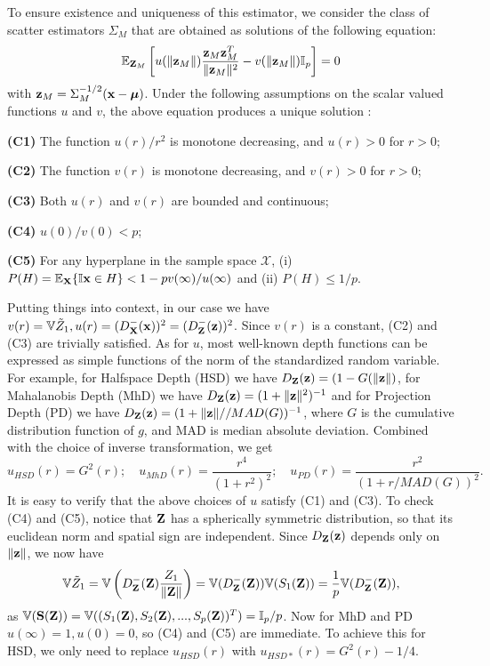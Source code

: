 To ensure existence and uniqueness of this estimator, we consider the class of scatter estimators $\Sigma_M$ that are obtained as solutions of the following equation:
%
\begin{equation}
{\mathbb{E}}_{{\mathbf{Z}}_M} \left[ u( \| {\bf{z}}_M \| )  \frac{{\bf{z}}_M {\bf{z}}_M^T}{\| {\bf{z}}_M \|^2}  - v( \| {\bf{z}}_M \| ) {\mathbb{I}}_p \right] = 0
\end{equation}
%
with ${\bf{z}}_M = \Sigma_M^{-1/2} ({\bf{x}} - {\boldsymbol{\mu}})$. Under the following assumptions on the scalar valued functions $u$ and $v$, the above equation produces a unique solution \citep{HuberBook81}:
%

\vspace{1em}
\noindent\textbf{(C1)} The function $u(r)/r^2$ is monotone decreasing, and $u(r)>0$ for $r>0$;

\noindent\textbf{(C2)}  The function $v(r)$ is monotone decreasing, and $v(r)>0$ for $r>0$;

\noindent\textbf{(C3)} Both $u(r)$ and $v(r)$ are bounded and continuous;

\noindent\textbf{(C4)} $u(0) / v(0) < p$;

\noindent\textbf{(C5)} For any hyperplane in the sample space $\mathcal X$, (i) $P(H) = {\mathbb{E}}_{\mathbf{X}} \{ {\mathbb{I}}{{\bf{x}} \in H} \} < 1 - p v(\infty) / u(\infty)$ and (ii) $P(H) \leq 1/p$.
%

\vspace{1em}
\noindent Putting things into context, in our case we have $v(r) = {\mathbb{V}}\tilde Z_1, u(r) = (D^-_{\mathbf{X}}({\bf{x}}))^2 = (D^-_{\mathbf{Z}}({\bf{z}}))^2$. Since $v(r)$ is a constant, (C2) and (C3) are trivially satisfied. As for $u$, most well-known depth functions can be expressed as simple functions of the norm of the standardized random variable. For example, for Halfspace Depth (HSD) we have $D_{\mathbf{Z}} ({\bf{z}}) = (1 - G(\| {\bf{z}} \|)$, for Mahalanobis Depth (MhD) we have $D_{\mathbf{Z}} ({\bf{z}}) = (1+\| {\bf{z}} \|^2)^{-1}$ and for Projection Depth (PD) we have $D_{\mathbf{Z}} ({\bf{z}}) = (1+\| {\bf{z}} \|//MAD(G))^{-1}$, where $G$ is the cumulative distribution function of $g$, and MAD is median absolute deviation. Combined with the choice of inverse transformation, we get
$$
u_{HSD} (r) = G^2 (r); \quad u_{MhD}(r)  = \frac{r^4}{(1 + r^2)^2}; \quad u_{PD}(r)  = \frac{r^2}{(1 + r/MAD(G))^2}.
$$
%
It is easy to verify that the above choices of $u$ satisfy (C1) and (C3). To check (C4) and (C5), notice that ${\mathbf{Z}}$ has a spherically symmetric distribution, so that its euclidean norm and spatial sign are independent. Since $D_{\mathbf{Z}}({\bf{z}})$ depends only on $\| {\bf{z}} \|$, we now have
%
$$
{\mathbb{V}} \tilde Z_1 = {\mathbb{V}} \left( D^-_{\mathbf{Z}} ({\mathbf{Z}}) \frac{Z_1}{ \|{\mathbf{Z}} \|} \right) = {\mathbb{V}} (D^-_{\mathbf{Z}} ({\mathbf{Z}})) {\mathbb{V}} (S_1 ({\mathbf{Z}})) = \frac{1}{p} {\mathbb{V}} (D^-_{\mathbf{Z}} ({\mathbf{Z}})),
$$
%
as ${\mathbb{V}}({\mathbf{S}}({\mathbf{Z}})) = {\mathbb{V}}((S_1({\mathbf{Z}}), S_2({\mathbf{Z}}), ..., S_p({\mathbf{Z}}))^T) = {\mathbb{I}}_p/p$. Now for MhD and PD $u(\infty)=1, u(0)=0$, so (C4) and (C5) are immediate. To achieve this for HSD, we only need to replace $u_{HSD}(r)$ with $u_{HSD*}(r) = G^2(r) - 1/4$.

